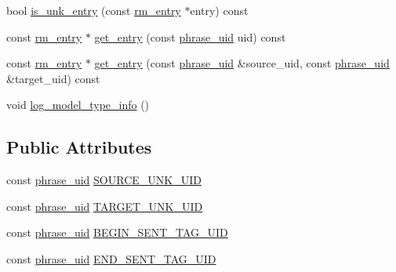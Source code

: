 \begin{DoxyCompactItemize}
\item 
bool \hyperlink{classuva_1_1smt_1_1bpbd_1_1server_1_1rm_1_1models_1_1rm__basic__model_a9d26d02509fcdea72eba29b24639ff41}{is\+\_\+unk\+\_\+entry} (const \hyperlink{namespaceuva_1_1smt_1_1bpbd_1_1server_1_1rm_1_1models_a67353bb21590b2a2adf05500899439ed}{rm\+\_\+entry} $\ast$entry) const 
\item 
const \hyperlink{namespaceuva_1_1smt_1_1bpbd_1_1server_1_1rm_1_1models_a67353bb21590b2a2adf05500899439ed}{rm\+\_\+entry} $\ast$ \hyperlink{classuva_1_1smt_1_1bpbd_1_1server_1_1rm_1_1models_1_1rm__basic__model_a844cb4c92b61b1510ed56ee3e898ab80}{get\+\_\+entry} (const \hyperlink{namespaceuva_1_1smt_1_1bpbd_1_1server_ad18d4cdf5504e76c22b0c124ff60b44f}{phrase\+\_\+uid} uid) const 
\item 
const \hyperlink{namespaceuva_1_1smt_1_1bpbd_1_1server_1_1rm_1_1models_a67353bb21590b2a2adf05500899439ed}{rm\+\_\+entry} $\ast$ \hyperlink{classuva_1_1smt_1_1bpbd_1_1server_1_1rm_1_1models_1_1rm__basic__model_aca76d7b1db170bd9e7abceaea016ca11}{get\+\_\+entry} (const \hyperlink{namespaceuva_1_1smt_1_1bpbd_1_1server_ad18d4cdf5504e76c22b0c124ff60b44f}{phrase\+\_\+uid} \&source\+\_\+uid, const \hyperlink{namespaceuva_1_1smt_1_1bpbd_1_1server_ad18d4cdf5504e76c22b0c124ff60b44f}{phrase\+\_\+uid} \&target\+\_\+uid) const 
\item 
void \hyperlink{classuva_1_1smt_1_1bpbd_1_1server_1_1rm_1_1models_1_1rm__basic__model_aa3be2952808110b281871f3aa24dc7b2}{log\+\_\+model\+\_\+type\+\_\+info} ()
\end{DoxyCompactItemize}
\subsection*{Public Attributes}
\begin{DoxyCompactItemize}
\item 
const \hyperlink{namespaceuva_1_1smt_1_1bpbd_1_1server_ad18d4cdf5504e76c22b0c124ff60b44f}{phrase\+\_\+uid} \hyperlink{classuva_1_1smt_1_1bpbd_1_1server_1_1rm_1_1models_1_1rm__basic__model_aba768b224f5e43c481f5e138a2414053}{S\+O\+U\+R\+C\+E\+\_\+\+U\+N\+K\+\_\+\+U\+I\+D}
\item 
const \hyperlink{namespaceuva_1_1smt_1_1bpbd_1_1server_ad18d4cdf5504e76c22b0c124ff60b44f}{phrase\+\_\+uid} \hyperlink{classuva_1_1smt_1_1bpbd_1_1server_1_1rm_1_1models_1_1rm__basic__model_af11162881f5732c5ed1dd641a708d98c}{T\+A\+R\+G\+E\+T\+\_\+\+U\+N\+K\+\_\+\+U\+I\+D}
\item 
const \hyperlink{namespaceuva_1_1smt_1_1bpbd_1_1server_ad18d4cdf5504e76c22b0c124ff60b44f}{phrase\+\_\+uid} \hyperlink{classuva_1_1smt_1_1bpbd_1_1server_1_1rm_1_1models_1_1rm__basic__model_a05d8d0347ee319147d02f7c7488c8ed6}{B\+E\+G\+I\+N\+\_\+\+S\+E\+N\+T\+\_\+\+T\+A\+G\+\_\+\+U\+I\+D}
\item 
const \hyperlink{namespaceuva_1_1smt_1_1bpbd_1_1server_ad18d4cdf5504e76c22b0c124ff60b44f}{phrase\+\_\+uid} \hyperlink{classuva_1_1smt_1_1bpbd_1_1server_1_1rm_1_1models_1_1rm__basic__model_a1c7fcf0195c38e5fc7930a230b9986ad}{E\+N\+D\+\_\+\+S\+E\+N\+T\+\_\+\+T\+A\+G\+\_\+\+U\+I\+D}
\end{DoxyCompactItemize}


